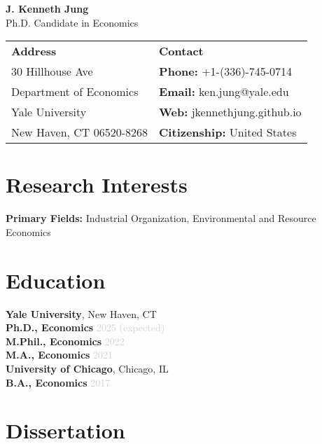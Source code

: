 \documentclass[11pt,letterpaper]{article}
\newcommand{\jobtitle}[1]{\textbf{\color{mediumgray}#1}}
\newcommand{\daterange}[1]{\textcolor{lightgray}{#1}}
\newenvironment{cvheader}
{\begin{center}\Large}
{\end{center}}
\begin{document}
\begin{cvheader}
{\Huge\textbf{J. Kenneth Jung}}\\
{\large\textcolor{mediumgray}{Ph.D. Candidate in Economics}}
\end{cvheader}

\vspace{8pt}

\begin{center}
\begin{tabular}{ll}
\textbf{Address} & \textbf{Contact} \\
30 Hillhouse Ave & \textbf{Phone:} +1-(336)-745-0714 \\
Department of Economics & \textbf{Email:} ken.jung@yale.edu \\
Yale University & \textbf{Web:} jkennethjung.github.io \\
New Haven, CT 06520-8268 & \textbf{Citizenship:} United States \\
\end{tabular}
\end{center}

\vspace{8pt}

\section*{Research Interests}
\textbf{Primary Fields:} Industrial Organization, Environmental and Resource Economics

\section*{Education}

\textbf{Yale University}, New Haven, CT \\
\jobtitle{Ph.D., Economics} \hfill \daterange{2025 (expected)} \\
\jobtitle{M.Phil., Economics} \hfill \daterange{2022} \\
\jobtitle{M.A., Economics} \hfill \daterange{2021} \\

\textbf{University of Chicago}, Chicago, IL \\
\jobtitle{B.A., Economics} \hfill \daterange{2017}

\section*{Dissertation}
\end{document}
